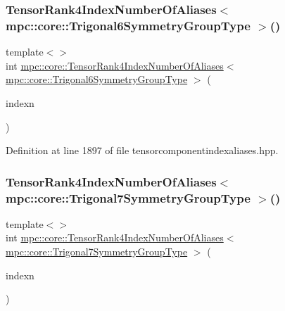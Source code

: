 \subsubsection{\texorpdfstring{Tensor\+Rank4\+Index\+Number\+Of\+Aliases$<$ mpc\+::core\+::\+Trigonal6\+Symmetry\+Group\+Type $>$()}{TensorRank4IndexNumberOfAliases< mpc::core::Trigonal6SymmetryGroupType >()}}
{\footnotesize\ttfamily template$<$$>$ \\
int \mbox{\hyperlink{namespacempc_1_1core_a8d98ed039053b282c6ce8cff2fad214c}{mpc\+::core\+::\+Tensor\+Rank4\+Index\+Number\+Of\+Aliases}}$<$ \mbox{\hyperlink{structmpc_1_1core_1_1_trigonal6_symmetry_group_type}{mpc\+::core\+::\+Trigonal6\+Symmetry\+Group\+Type}} $>$ (\begin{DoxyParamCaption}\item[{const \mbox{\hyperlink{classmpc_1_1core_1_1_tensor_rank_n_component_index}{mpc\+::core\+::\+Tensor\+Rank\+N\+Component\+Index}}$<$ 4 $>$ \&}]{indexn }\end{DoxyParamCaption})\hspace{0.3cm}{\ttfamily [inline]}}



Definition at line 1897 of file tensorcomponentindexaliases.\+hpp.

\mbox{\label{namespacempc_1_1core_ab16fd1951e2b9044702fa7844807dd84}} 
\subsubsection{\texorpdfstring{Tensor\+Rank4\+Index\+Number\+Of\+Aliases$<$ mpc\+::core\+::\+Trigonal7\+Symmetry\+Group\+Type $>$()}{TensorRank4IndexNumberOfAliases< mpc::core::Trigonal7SymmetryGroupType >()}}
{\footnotesize\ttfamily template$<$$>$ \\
int \mbox{\hyperlink{namespacempc_1_1core_a8d98ed039053b282c6ce8cff2fad214c}{mpc\+::core\+::\+Tensor\+Rank4\+Index\+Number\+Of\+Aliases}}$<$ \mbox{\hyperlink{structmpc_1_1core_1_1_trigonal7_symmetry_group_type}{mpc\+::core\+::\+Trigonal7\+Symmetry\+Group\+Type}} $>$ (\begin{DoxyParamCaption}\item[{const \mbox{\hyperlink{classmpc_1_1core_1_1_tensor_rank_n_component_index}{mpc\+::core\+::\+Tensor\+Rank\+N\+Component\+Index}}$<$ 4 $>$ \&}]{indexn }\end{DoxyParamCaption})\hspace{0.3cm}{\ttfamily [inline]}}



